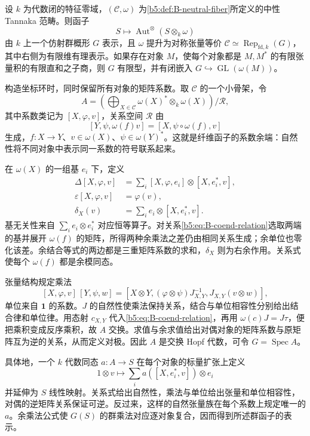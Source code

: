 \begin{theorem}[中性 Tannaka 重构]\label{b5:thm:B-neutral-tannaka}
	设 \(k\) 为代数闭的特征零域，\((\mathcal C,\omega)\) 为\cref{b5:def:B-neutral-fiber}所定义的中性 Tannaka 范畴。则函子
	\[
		S\longmapsto\operatorname{Aut}^{\otimes}(S\otimes_k\omega)
	\]
	由 \(k\) 上一个仿射群概形 \(G\) 表示，且 \(\omega\) 提升为对称张量等价 \(\mathcal C\simeq\operatorname{Rep}_{\mathrm{fd},k}(G)\)，其中右侧为有限维有理表示。如果存在对象 \(M\)，使每个对象都是 \(M,M^*\) 的有限张量积的有限直和之子商，则 \(G\) 有限型，并有闭嵌入 \(G\hookrightarrow\operatorname{GL}(\omega(M))\)。
\end{theorem}
\begin{proofsketch}
	构造坐标环时，同时保留所有对象的矩阵系数。取 \(\mathcal C\) 的一个小骨架，令
	\[
		A=\left(\bigoplus_{X\in\mathcal C}\omega(X)^*\otimes_k\omega(X)\right)\big/\mathcal R,
	\]
	其中系数类记为 \([X,\varphi,v]\)，关系空间 \(\mathcal R\) 由
	\begin{equation}\label{b5:eq:B-coend-relation}
		[Y,\psi,\omega(f)v]=[X,\psi\circ\omega(f),v]
	\end{equation}
	生成，\(f:X\to Y\)、\(v\in\omega(X)\)、\(\psi\in\omega(Y)^*\)。这就是纤维函子的系数余端：自然性将不同对象中表示同一系数的符号联系起来。

	在 \(\omega(X)\) 的一组基 \(e_i\) 下，定义
	\[
		\begin{aligned}
			\Delta[X,\varphi,v]&=\sum_i[X,\varphi,e_i]\otimes[X,e_i^*,v],\\
			\varepsilon[X,\varphi,v]&=\varphi(v),\\
			\delta_X(v)&=\sum_i e_i\otimes[X,e_i^*,v].
		\end{aligned}
	\]
	基无关性来自 \(\sum_i e_i\otimes e_i^*\) 对应恒等算子。对关系\eqref{b5:eq:B-coend-relation}选取两端的基并展开 \(\omega(f)\) 的矩阵，所得两种余乘法之差仍由相同关系生成；余单位也零化该差。余结合等式的两边都是三重矩阵系数的求和，\(\delta_X\) 则为右余作用。关系式使每个 \(\omega(f)\) 都是余模同态。

	张量结构规定乘法
	\[
		[X,\varphi,v]\,[Y,\psi,w]
		=[X\otimes Y,(\varphi\otimes\psi)J_{X,Y}^{-1},J_{X,Y}(v\otimes w)],
	\]
	单位来自 \(\mathbf1\) 的系数。\(J\) 的自然性使乘法保持关系，结合与单位相容性分别给出结合律和单位律。用态射 \(c_{X,Y}\) 代入\eqref{b5:eq:B-coend-relation}，再用 \(\omega(c)J=J\tau\)，便把乘积变成反序乘积，故 \(A\) 交换。求值与余求值给出对偶对象的矩阵系数与原矩阵互为逆的关系，从而定义对极。因此 \(A\) 是交换 Hopf 代数，可令 \(G=\operatorname{Spec}A\)。

	具体地，一个 \(k\) 代数同态 \(a:A\to S\) 在每个对象的标量扩张上定义
	\[
		1\otimes v\longmapsto\sum_i a([X,e_i^*,v])\otimes e_i
	\]
	并延伸为 \(S\) 线性映射。关系式给出自然性，乘法与单位给出张量和单位相容性，对偶的逆矩阵关系保证可逆。反过来，这样的自然张量族在每个系数上规定唯一的 \(a\)。余乘法公式使 \(G(S)\) 的群乘法对应逐对象复合，因而得到所述群函子的表示。


\end{proofsketch}
